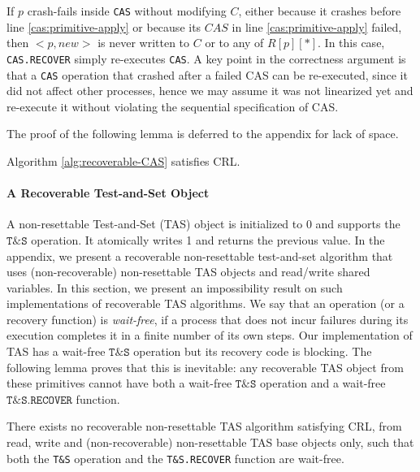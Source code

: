 If $p$ crash-fails inside \texttt{CAS} without modifying $C$, either because it crashes before line \ref{cas:primitive-apply} or because its $CAS$ in line \ref{cas:primitive-apply} failed, then ${<}p,new{>}$ is never written to $C$ or to any of $R[p][*]$. In this case, \texttt{CAS.RECOVER} simply re-executes  \texttt{CAS}. A key point in the correctness argument is that a \texttt{CAS} operation that crashed after a failed CAS can be re-executed, since it did not affect other processes, hence we may assume it was not linearized yet and re-execute it without violating the sequential specification of CAS.

The proof of the following lemma is deferred to the appendix for lack of space.

\begin{lemma}
\label{lemma:CAS-alg-is-CRL}
	Algorithm \ref{alg:recoverable-CAS} satisfies CRL.
\end{lemma}


\paragraph*{A Recoverable Test-and-Set Object}

A non-resettable Test-and-Set (TAS) object is initialized to 0 and supports the $\texttt{T\&S}$ operation. It atomically writes 1 and returns the previous value. In the appendix, we present a recoverable non-resettable test-and-set algorithm that uses (non-recoverable) non-resettable TAS objects and read/write shared variables. In this section, we present an impossibility result on such implementations of recoverable TAS algorithms. We say that an operation (or a recovery function) is \emph{wait-free}, if a process that does not incur failures during its execution completes it in a finite number of its own steps. Our implementation of TAS has a wait-free $\texttt{T\&S}$ operation but its recovery code is blocking. The following lemma proves that this is inevitable: any recoverable TAS object from these primitives cannot have both a wait-free $\texttt{T\&S}$ operation and a wait-free $\texttt{T\&S.RECOVER}$ function.

\begin{lemma}
	There exists no recoverable non-resettable TAS algorithm satisfying CRL, from read, write and (non-recoverable) non-resettable TAS base objects only, such that both the \texttt{T\&S} operation and the \texttt{T\&S.RECOVER} function are wait-free.
\end{lemma}

